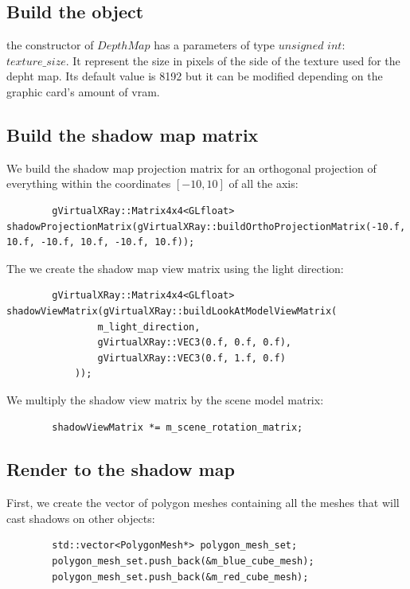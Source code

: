 \documentclass[12pt]{report}
\begin{document}
\subsection{Build the object}

	the constructor of $DepthMap$ has a parameters of type $unsigned$ $int$: $texture\_size$. It represent the size in pixels of the side of the texture used for the depht map. Its default value is 8192 but it can be modified depending on the graphic card's amount of vram.
	
\subsection{Build the shadow map matrix}

We build the shadow map projection matrix for an orthogonal projection of everything within the coordinates $[-10, 10]$ of all the axis: 

\begin{lstlisting}
    	gVirtualXRay::Matrix4x4<GLfloat> shadowProjectionMatrix(gVirtualXRay::buildOrthoProjectionMatrix(-10.f, 10.f, -10.f, 10.f, -10.f, 10.f));
\end{lstlisting}

The we create the shadow map view matrix using the light direction:
\begin{lstlisting}
    	gVirtualXRay::Matrix4x4<GLfloat> shadowViewMatrix(gVirtualXRay::buildLookAtModelViewMatrix(
    			m_light_direction,
    			gVirtualXRay::VEC3(0.f, 0.f, 0.f),
    			gVirtualXRay::VEC3(0.f, 1.f, 0.f)
    		));
\end{lstlisting}

We multiply the shadow view matrix by the scene model matrix:

\begin{lstlisting}
    	shadowViewMatrix *= m_scene_rotation_matrix;
\end{lstlisting}

\subsection{Render to the shadow map}

First, we create the vector of polygon meshes containing all the meshes that will cast shadows on other objects:

\begin{lstlisting}
    	std::vector<PolygonMesh*> polygon_mesh_set;
    	polygon_mesh_set.push_back(&m_blue_cube_mesh);
    	polygon_mesh_set.push_back(&m_red_cube_mesh);
\end{lstlisting}
\end{document}
